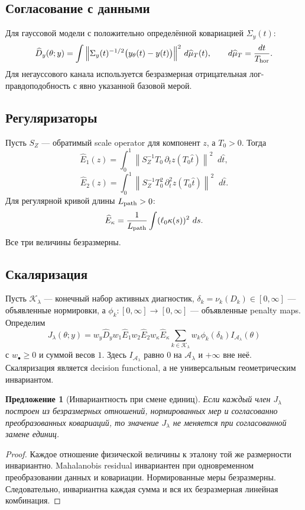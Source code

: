 \documentclass[11pt,a4paper]{article}
\theoremstyle{definition}
\theoremstyle{plain}
\newtheorem{proposition}[definition]{Предложение}
\theoremstyle{remark}
\newcommand{\A}{\mathcal{A}}
\newcommand{\dd}{\mathop{}\!d}
\newcommand{\norm}[1]{\left\lVert #1\right\rVert}
\begin{document}
\subsection{Согласование с данными}

Для гауссовой модели с положительно определённой ковариацией
$\Sigma_y(t)$:
\[
\widehat D_y(\theta;y)=
\int
\norm{
\Sigma_y(t)^{-1/2}
\bigl(y_\theta(t)-y(t)\bigr)
}^{2}\,\dd\widehat\mu_T(t),
\qquad
\dd\widehat\mu_T=\frac{\dd t}{T_{\rm hor}}.
\]
Для негауссового канала используется безразмерная отрицательная
лог-правдоподобность с явно указанной базовой мерой.

\subsection{Регуляризаторы}

Пусть $S_Z$ --- обратимый scale operator для компонент $z$, а $T_0>0$.
Тогда
\[
\widehat E_1(z)=
\int_0^1
\norm{S_Z^{-1}T_0\,\partial_tz(T_0\widehat t)}^2
\dd\widehat t,
\]
\[
\widehat E_2(z)=
\int_0^1
\norm{S_Z^{-1}T_0^2\,\partial_t^2z(T_0\widehat t)}^2
\dd\widehat t.
\]
Для регулярной кривой длины $L_{\rm path}>0$:
\[
\widehat E_\kappa=
\frac{1}{L_{\rm path}}\int
(\ell_0\kappa(s))^2\,\dd s.
\]
Все три величины безразмерны.

\subsection{Скаляризация}

Пусть $\mathcal K_\lambda$ --- конечный набор активных диагностик,
$\delta_k=\nu_k(D_k)\in[0,\infty]$ --- объявленные нормировки, а
$\phi_k:[0,\infty]\to[0,\infty]$ --- объявленные penalty maps. Определим
\[
\boxed{
J_\lambda(\theta;y)=
w_y\widehat D_y
w_1\widehat E_1
w_2\widehat E_2
w_\kappa\widehat E_\kappa
\sum_{k\in\mathcal K_\lambda}w_k\phi_k(\delta_k)
I_{\A_\lambda}(\theta)
}
\]
с $w_\bullet\ge0$ и суммой весов $1$. Здесь $I_{\A_\lambda}$ равно
$0$ на $\A_\lambda$ и $+\infty$ вне неё. Скаляризация является
decision functional, а не универсальным геометрическим инвариантом.

\begin{proposition}[Инвариантность при смене единиц]
Если каждый член $J_\lambda$ построен из безразмерных отношений,
нормированных мер и согласованно преобразованных ковариаций, то значение
$J_\lambda$ не меняется при согласованной замене единиц.
\end{proposition}
\begin{proof}
Каждое отношение физической величины к эталону той же размерности
инвариантно. Mahalanobis residual инвариантен при одновременном
преобразовании данных и ковариации. Нормированные меры безразмерны.
Следовательно, инвариантна каждая сумма и вся их безразмерная линейная
комбинация.
\end{proof}
\end{document}
